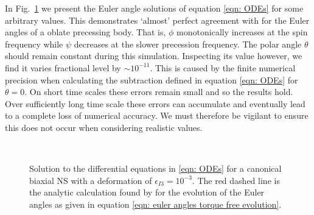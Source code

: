 \documentclass[../full_thesis/full_thesis.tex]{subfiles}
\begin{document}
In Fig.~\ref{fig: biaxial body no torque} we present the Euler angle solutions
of equation \eqref{eqn: ODEs} for some arbitrary values.
This demonstrates `almost'
perfect agreement with \citet{Jones2001} for the Euler angles of a oblate
precessing body. That is, $\phi$ monotonically increases at the spin frequency
while $\psi$ decreases at the slower precession frequency. The polar angle
$\theta$ should remain constant during this simulation. Inspecting its value
however, we find it varies fractional level by $\sim 10^{-11}$.
This is caused by the finite numerical precision when calculating the
subtraction defined in equation \eqref{eqn: ODEs} for $\dot{\theta}=0$. On
short time scales these errors remain small and so
the results hold. Over sufficiently long time scale these errors can
accumulate and eventually lead to a complete loss of numerical accuracy. We
must therefore be vigilant to ensure this does not occur when considering
realistic values.
\begin{figure}[htb]
    \centering
{} \\
\caption{Solution to the differential equations in \eqref{eqn: ODEs} for a
canonical biaxial NS with a deformation of $\epsilon_{I3} = 10^{-3}$. The red
dashed line is the analytic calculation found by \citet{Jones2001} for the
evolution of the Euler angles as given in equation
\eqref{eqn: euler angles torque free evolution}.}
\label{fig: biaxial body no torque}
\end{figure}
\end{document}
